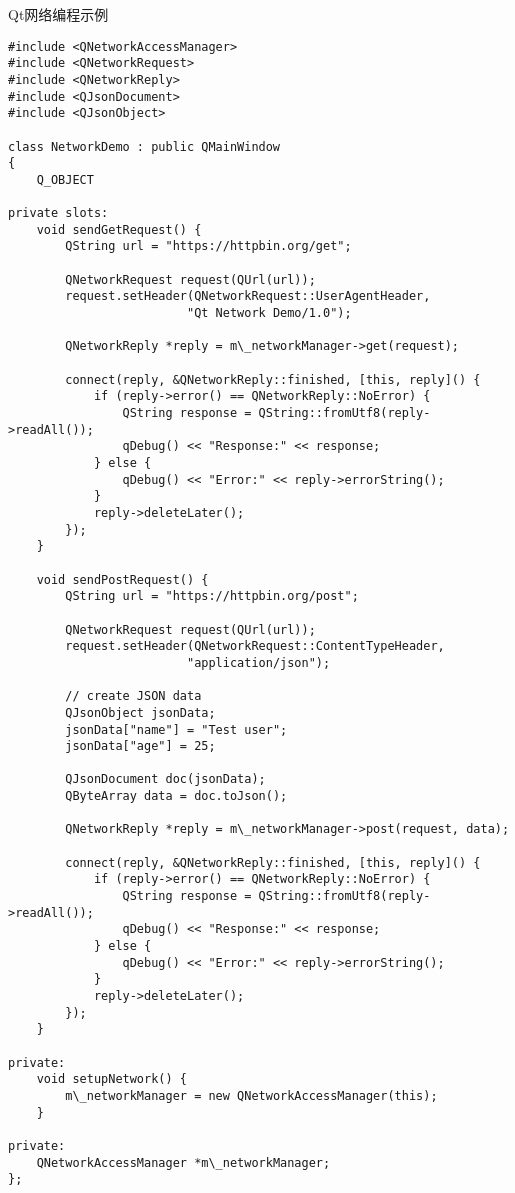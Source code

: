 \documentclass[UTF8,aspectratio=169]{beamer}
\begin{document}
\begin{frame}[fragile]{Qt网络编程示例}
    \begin{lstlisting}
#include <QNetworkAccessManager>
#include <QNetworkRequest>
#include <QNetworkReply>
#include <QJsonDocument>
#include <QJsonObject>

class NetworkDemo : public QMainWindow
{
    Q_OBJECT

private slots:
    void sendGetRequest() {
        QString url = "https://httpbin.org/get";

        QNetworkRequest request(QUrl(url));
        request.setHeader(QNetworkRequest::UserAgentHeader,
                         "Qt Network Demo/1.0");

        QNetworkReply *reply = m\_networkManager->get(request);

        connect(reply, &QNetworkReply::finished, [this, reply]() {
            if (reply->error() == QNetworkReply::NoError) {
                QString response = QString::fromUtf8(reply->readAll());
                qDebug() << "Response:" << response;
            } else {
                qDebug() << "Error:" << reply->errorString();
            }
            reply->deleteLater();
        });
    }

    void sendPostRequest() {
        QString url = "https://httpbin.org/post";

        QNetworkRequest request(QUrl(url));
        request.setHeader(QNetworkRequest::ContentTypeHeader,
                         "application/json");

        // create JSON data
        QJsonObject jsonData;
        jsonData["name"] = "Test user";
        jsonData["age"] = 25;

        QJsonDocument doc(jsonData);
        QByteArray data = doc.toJson();

        QNetworkReply *reply = m\_networkManager->post(request, data);

        connect(reply, &QNetworkReply::finished, [this, reply]() {
            if (reply->error() == QNetworkReply::NoError) {
                QString response = QString::fromUtf8(reply->readAll());
                qDebug() << "Response:" << response;
            } else {
                qDebug() << "Error:" << reply->errorString();
            }
            reply->deleteLater();
        });
    }

private:
    void setupNetwork() {
        m\_networkManager = new QNetworkAccessManager(this);
    }

private:
    QNetworkAccessManager *m\_networkManager;
};
    \end{lstlisting}
\end{frame}
\end{document}
